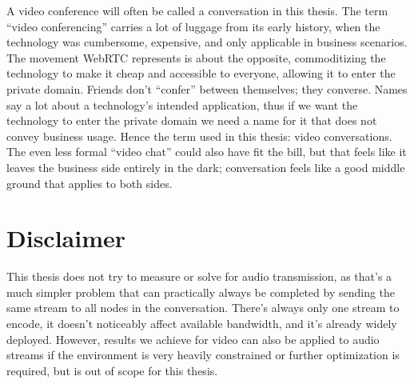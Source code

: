 A video conference will often be called a conversation in this thesis. The term ``video conferencing'' carries a lot of luggage from its early history, when the technology was cumbersome, expensive, and only applicable in business scenarios. The movement WebRTC represents is about the opposite, commoditizing the technology to make it cheap and accessible to everyone, allowing it to enter the private domain. Friends don't ``confer'' between themselves; they converse. Names say a lot about a technology's intended application, thus if we want the technology to enter the private domain we need a name for it that does not convey business usage. Hence the term used in this thesis: video conversations. The even less formal ``video chat'' could also have fit the bill, but that feels like it leaves the business side entirely in the dark; conversation feels like a good middle ground that applies to both sides.


\section{Disclaimer}

This thesis does not try to measure or solve for audio transmission, as that's a much simpler problem that can practically always be completed by sending the same stream to all nodes in the conversation. There's always only one stream to encode, it doesn't noticeably affect available bandwidth, and it's already widely deployed. However, results we achieve for video can also be applied to audio streams if the environment is very heavily constrained or further optimization is required, but is out of scope for this thesis.
